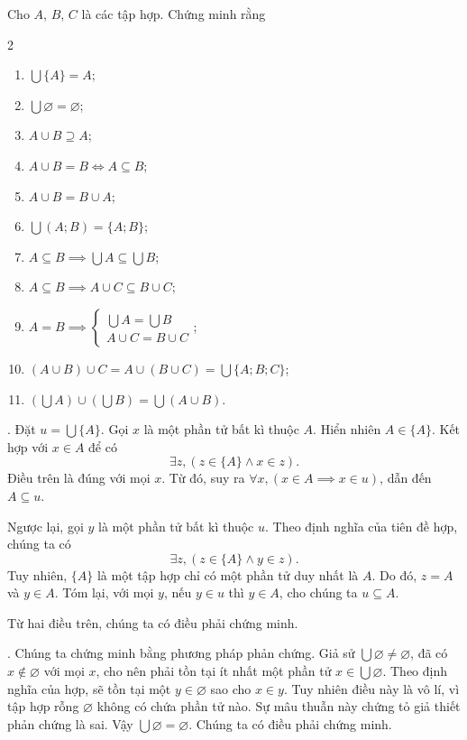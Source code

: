 \exercise Cho $A$, $B$, $C$ là các tập hợp. Chứng minh rằng
\begin{multicols}{2}
   \begin{enumerate}
      \item $\bigcup \{A\} = A$;
      \item $\bigcup \varnothing = \varnothing$;
      \item $A \cup B \supseteq A$;
      \item $A \cup B = B \iff A \subseteq B$;
      \item $A \cup B = B \cup A$;
      \item $\bigcup (A; B) = \{A; B\}$;
      \item $A \subseteq B \implies \bigcup A \subseteq \bigcup B$;
      \item $A \subseteq B \implies A \cup C \subseteq B \cup C$;
      \item $A = B \implies \begin{cases}
                  \bigcup A = \bigcup B \\
                  A \cup C = B \cup C
               \end{cases}$;
      \item $(A \cup B) \cup C = A \cup (B \cup C) = \bigcup \{A; B; C\}$;
      \item $\left(\bigcup A\right) \cup \left(\bigcup B\right) = \bigcup(A \cup B)$.
   \end{enumerate}
\end{multicols}

\solution

\setcounter{subexercise}{1}
. Đặt $u = \bigcup \{A\}$. Gọi $x$ là một phần tử bất kì thuộc $A$. Hiển nhiên $A \in \{A\}$. Kết hợp với $x \in A$ để có
$$
   \exists z, (z \in \{A\} \land x \in z).
$$
Điều trên là đúng với mọi $x$. Từ đó, suy ra $\forall x, (x \in A \implies x \in u)$, dẫn đến $A \subseteq u$.

Ngược lại, gọi $y$ là một phần tử bất kì thuộc $u$. Theo định nghĩa của tiên đề hợp, chúng ta có
$$
   \exists z, (z \in \{A\} \land y \in z).
$$
Tuy nhiên, $\{A\}$ là một tập hợp chỉ có một phần tử duy nhất là $A$. Do đó, $z = A$ và $y \in A$. Tóm lại, với mọi $y$, nếu $y \in u$ thì $y \in A$, cho chúng ta $u \subseteq A$.

Từ hai điều trên, chúng ta có điều phải chứng minh.

. Chúng ta chứng minh bằng phương pháp phản chứng. Giả sử $\bigcup \varnothing \neq \varnothing$, đã có $x \notin \varnothing$ với mọi $x$, cho nên phải tồn tại ít nhất một phần tử $x \in \bigcup \varnothing$. Theo định nghĩa của hợp, sẽ tồn tại một $y \in \varnothing$ sao cho $x \in y$. Tuy nhiên điều này là vô lí, vì tập hợp rỗng $\varnothing$ không có chứa phần tử nào. Sự mâu thuẫn này chứng tỏ giả thiết phản chứng là sai. Vậy $\bigcup \varnothing = \varnothing$. Chúng ta có điều phải chứng minh.

